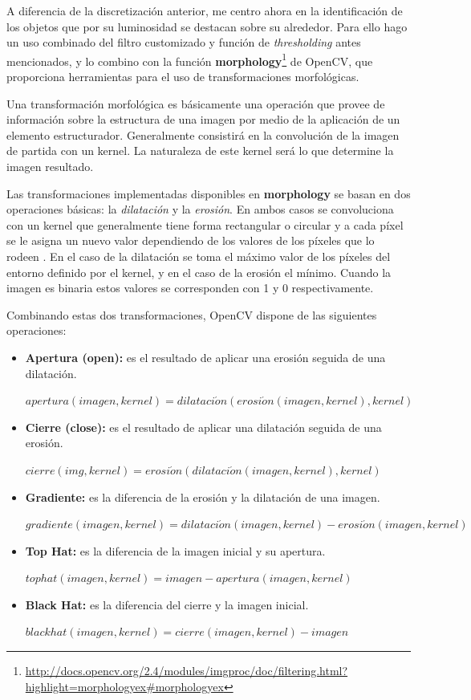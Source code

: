 \documentclass[a4paper,12pt]{article}
\begin{document}
A diferencia de la discretización anterior, me centro ahora en la identificación de los objetos que por su luminosidad se destacan sobre su alrededor. Para ello hago un uso combinado del filtro customizado y función de \textit{thresholding} antes mencionados, y lo combino con la función \textbf{morphology}\footnote{\url{http://docs.opencv.org/2.4/modules/imgproc/doc/filtering.html?highlight=morphologyex#morphologyex}} de OpenCV, que proporciona herramientas para el uso de transformaciones morfológicas.

Una transformación morfológica es básicamente una operación que provee de información sobre la estructura de una imagen por medio de la aplicación de un elemento estructurador. Generalmente consistirá en la convolución de la imagen de partida con un kernel. La naturaleza de este kernel será lo que determine la imagen resultado.

Las transformaciones implementadas disponibles en \textbf{morphology} se basan en dos operaciones básicas: la \textit{dilatación} y la \textit{erosión}. En ambos casos se convoluciona con un kernel que generalmente tiene forma rectangular o circular y a cada píxel se le asigna un nuevo valor dependiendo de los valores de los píxeles que lo rodeen . En el caso de la dilatación se toma el máximo valor de los píxeles del entorno definido por el kernel, y en el caso de la erosión el mínimo. Cuando la imagen es binaria estos valores se corresponden con 1 y 0 respectivamente.

Combinando estas dos transformaciones, OpenCV dispone de las siguientes operaciones:
\begin{itemize}
\item \textbf{Apertura (open): } es el resultado de aplicar una erosión seguida de una dilatación.
\begin{center}
$apertura(imagen, kernel) = dilataci\acute{o}n(erosi\acute{o}n(imagen,kernel), kernel)$
\end{center}
\item \textbf{Cierre (close):} es el resultado de aplicar una dilatación seguida de una erosión.
\begin{center}
$cierre(img, kernel) = erosi\acute{o}n(dilataci\acute{o}n(imagen,kernel),kernel)$
\end{center}
\item \textbf{Gradiente:} es la diferencia de la erosión y la dilatación de una imagen.
\begin{center}
$gradiente(imagen, kernel) = dilataci\acute{o}n(imagen,kernel) - erosi\acute{o}n(imagen,kernel)$
\end{center}
\item \textbf{Top Hat:} es la diferencia de la imagen inicial y su apertura.
\begin{center}
$tophat(imagen, kernel) = imagen - apertura(imagen, kernel)$
\end{center}
\item \textbf{Black Hat:} es la diferencia del cierre y la imagen inicial.
\begin{center}
$blackhat(imagen, kernel) = cierre(imagen, kernel)- imagen$
\end{center}
\end{itemize}
\end{document}
